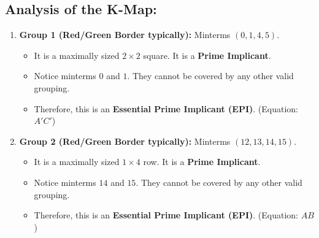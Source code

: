 \documentclass[12pt,a3paper]{article}
\begin{document}
\begin{enumerate}
\begin{tcolorbox}[enhanced,breakable,ansbox,colback=cC!4,colframe=cC,boxrule=0.8pt,arc=5pt,title={\textbf{Answer}},fonttitle=\bfseries\color{white},colbacktitle=cC]
\begin{center}
\begin{karnaugh-map}[4][4][1][$CD$][$AB$]
        
        
    \end{karnaugh-map}
\end{center}

\subsection*{Analysis of the K-Map:}

\begin{enumerate}
    \item \textbf{Group 1 (Red/Green Border typically):} Minterms $(0, 1, 4, 5)$. 
    \begin{itemize}
        \item It is a maximally sized $2 \times 2$ square. It is a \textbf{Prime Implicant}.
        \item Notice minterms $0$ and $1$. They cannot be covered by any other valid grouping.
        \item Therefore, this is an \textbf{\textcolor{cC}{Essential Prime Implicant (EPI)}}. (Equation: $A'C'$)
    \end{itemize}
    
    \item \textbf{Group 2 (Red/Green Border typically):} Minterms $(12, 13, 14, 15)$.
    \begin{itemize}
        \item It is a maximally sized $1 \times 4$ row. It is a \textbf{Prime Implicant}.
        \item Notice minterms $14$ and $15$. They cannot be covered by any other valid grouping.
        \item Therefore, this is an \textbf{\textcolor{cC}{Essential Prime Implicant (EPI)}}. (Equation: $AB$)
    \end{itemize}
    

\end{enumerate}
\end{tcolorbox}
\end{enumerate}
\end{document}

